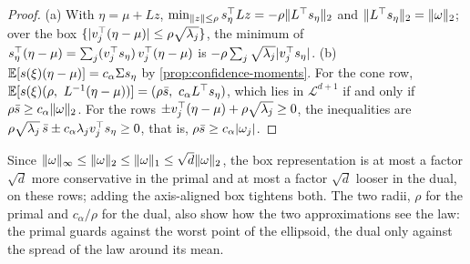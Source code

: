 \begin{proof}
(a) With $\eta = \mu + Lz$, $\min_{\lVert z \rVert \le \rho} s_\eta^\top Lz = -\rho\lVert L^\top s_\eta \rVert_2$ and $\lVert L^\top s_\eta \rVert_2 = \lVert \omega \rVert_2$;
over the box $\{\lvert v_j^\top(\eta - \mu) \rvert \le \rho\sqrt{\lambda_j}\}$, the minimum of $s_\eta^\top(\eta - \mu) = \sum_j (v_j^\top s_\eta)\, v_j^\top(\eta - \mu)$ is $-\rho\sum_j\sqrt{\lambda_j}\lvert v_j^\top s_\eta \rvert$.
(b) $\mathbb{E}[s(\xi)(\eta - \mu)] = c_\alpha\Sigma s_\eta$ by \cref{prop:confidence-moments}.
For the cone row, $\E[s(\xi)(\rho,\ L^{-1}(\eta - \mu))] = (\rho\bar s,\ c_\alpha L^\T s_\eta)$, which lies in $\mathcal{L}^{d+1}$ if and only if $\rho\bar s \ge c_\alpha\lVert \omega \rVert_2$.
For the rows $\pm v_j^\top(\eta - \mu) + \rho\sqrt{\lambda_j} \ge 0$, the inequalities are $\rho\sqrt{\lambda_j}\,\bar s \pm c_\alpha\lambda_j v_j^\top s_\eta \ge 0$, that is, $\rho\bar s \ge c_\alpha\lvert \omega_j \rvert$.
\end{proof}

Since $\lVert \omega \rVert_\infty \le \lVert \omega \rVert_2 \le \lVert \omega \rVert_1 \le \sqrt d\lVert \omega \rVert_2$,
the box representation is at most a factor $\sqrt d$ more conservative in the primal and at most a factor $\sqrt d$ looser in the dual, on these rows;
adding the axis-aligned box tightens both.
The two radii, $\rho$ for the primal and $c_\alpha/\rho$ for the dual, also show how the two approximations see the law:
the primal guards against the worst point of the ellipsoid, the dual only against the spread of the law around its mean.
